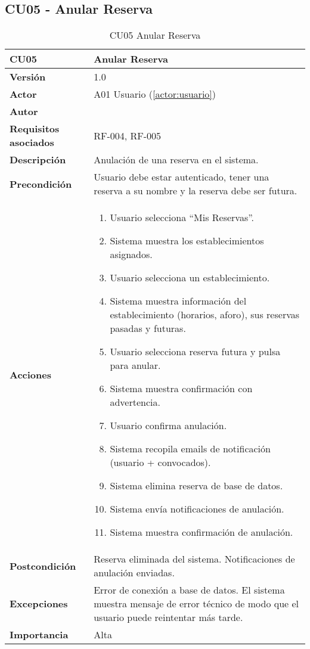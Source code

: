 \subsection{CU05 - Anular Reserva}

\begin{table}[H]
	\centering
	\begin{tabularx}{\linewidth}{ p{} p{} }
		\toprule
		\textbf{CU05}    & \textbf{Anular Reserva} \\
		\toprule
		\textbf{Versión}              & 1.0    \\
		\textbf{Actor}                & A01 Usuario (\ref{actor:usuario}) \\
		\textbf{Autor}                & \nombre \\
		\textbf{Requisitos asociados} & RF-004, RF-005 \\
		\textbf{Descripción}          & Anulación de una reserva en el sistema. \\
		\textbf{Precondición}         & Usuario debe estar autenticado, tener una reserva a su nombre y la reserva debe ser futura. \\
		\textbf{Acciones}             &
		\begin{enumerate}
			\def\labelenumi{\arabic{enumi}.}
			\tightlist
			\item Usuario selecciona ``Mis Reservas''.
            \item Sistema muestra los establecimientos asignados.
            \item Usuario selecciona un establecimiento.
            \item Sistema muestra información del establecimiento (horarios, aforo), sus reservas pasadas y futuras.
            \item Usuario selecciona reserva futura y pulsa para anular.
            \item Sistema muestra confirmación con advertencia.
            \item Usuario confirma anulación.
            \item Sistema recopila emails de notificación (usuario + convocados).
            \item Sistema elimina reserva de base de datos.
            \item Sistema envía notificaciones de anulación.
            \item Sistema muestra confirmación de anulación.
		\end{enumerate}\\
		\textbf{Postcondición}        & Reserva eliminada del sistema. Notificaciones de anulación enviadas.\\
		\textbf{Excepciones}          & Error de conexión a base de datos. El sistema muestra mensaje de error técnico de modo que el usuario puede reintentar más tarde.\\
		\textbf{Importancia}          & Alta \\
		\bottomrule
	\end{tabularx}
	\caption{CU05 Anular Reserva}
	\label{cu:anular-reserva}
\end{table}

